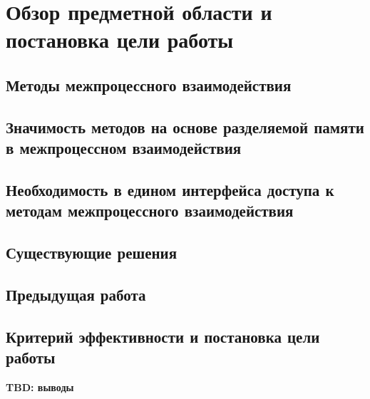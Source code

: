 \chapter{Обзор предметной области и постановка цели работы}

\startrelatedwork

\section{Методы межпроцессного взаимодействия}

\section{Значимость методов на основе разделяемой памяти в межпроцессном взаимодействия}

\section{Необходимость в едином интерфейса доступа к методам межпроцессного взаимодействия}

\section{Существующие решения}

\section{Предыдущая работа}

\finishrelatedwork

\section{Критерий эффективности и постановка цели работы}


\chapterconclusion

\textbf{TBD: выводы}